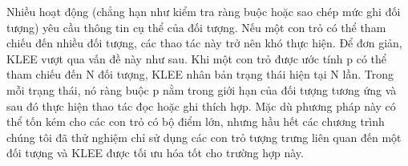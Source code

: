 \documentclass[12pt,a4paper]{article}
\begin{document}
\indent Nhiều hoạt động (chẳng hạn như kiểm tra ràng buộc hoặc sao chép mức ghi đối tượng) yêu cầu thông tin cụ thể của đối tượng. Nếu một con trỏ có thể tham chiếu đến nhiều đối tượng, các thao tác này trở nên khó thực hiện. Để đơn giản, KLEE vượt qua vấn đề này như sau. Khi một con trỏ được ước tính p có thể tham chiếu đến N đối tượng, KLEE nhân bản trạng thái hiện tại N lần. Trong mỗi trạng thái, nó ràng buộc p nằm trong giới hạn của đối tượng tương ứng và sau đó thực hiện thao tác đọc hoặc ghi thích hợp. Mặc dù phương pháp này có thể tốn kém cho các con trỏ có bộ điểm lớn, nhưng hầu hết các chương trình chúng tôi đã thử nghiệm chỉ sử dụng các con trỏ tượng trưng liên quan đến một đối tượng và KLEE được tối ưu hóa tốt cho trường hợp này.\newline
\end{document}
